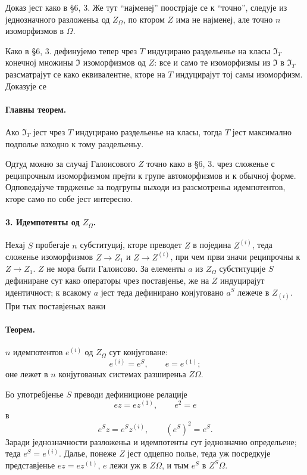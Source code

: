 ﻿\documentclass[11pt]{article}
\providecommand{\glqq}{``}
\providecommand{\grqq}{''}
\begin{document}
Доказ јест како в §6, 3. Же тут \glqq{}најменеј\grqq{} поострјаје се к \glqq{}точно\grqq{}, следује из једнозначного разложеньа од \(Z_\Omega\), по ктором \(Z\) има не најменеј, але точно \(n\) изоморфизмов в \(\Omega\).

Како в §6, 3. дефинујемо тепер чрез \(T\) индуцирано раздельенье на класы \(\mathfrak I_T\) конечној множины \(\mathfrak I\) изоморфизмов од \(Z\): все и само те изоморфизмы из \(\mathfrak I\) в \(\mathfrak I_T\) разсматрајут се како еквивалентне, кторе на \(T\) индуцирајут тој самы изоморфизм. Доказује се

\paragraph{Главны теорем.}
Ако \(\mathfrak I_T\) јест чрез \(T\) индуцирано раздельенье на класы, тогда \(T\) јест максимално подполье взходно к тому раздельеньу.

Одтуд можно за случај Галоисового \(Z\) точно како в §6, 3. чрез сложенье с реципрочным изоморфизмом прејти к групе автоморфизмов и к обычној форме. Одповедајуче тврдженье за подгрупы выходи из разсмотреньа идемпотентов, кторе само по собе јест интересно.

\paragraph{3. Идемпотенты од \(Z_\Omega\).}
Нехај \(S\) пробегаје \(n\) субституциј, кторе преводет \(Z\) в поједина \(Z^{(i)}\), теда сложенье изоморфизмов \(Z\to Z_1\) и \(Z\to Z^{(i)}\), при чем први значи реципрочны к \(Z\to Z_1\). \(Z\) не мора быти Галоисово. За елементы \(a\) из \(Z_\Omega\) субституције \(S\) дефиниране сут како операторы чрез поставјенье, же на \(Z\) индуцирајут идентичност; к всакому \(a\) јест теда дефинирано конјуговано \(a^S\) лежече в \(Z_{(i)}\). При тых поставјеньах важи

\paragraph{Теорем.}
\(n\) идемпотентов \(e^{(i)}\) од \(Z_\Omega\) сут конјуговане:
\[
        e^{(i)}=e^S,\qquad e=e^{(1)};
\]
оне лежет в \(n\) конјугованых системах разширеньа \(Z\Omega\).

Бо употребјенье \(S\) преводи дефиниционе релације
\[
        ez=ez^{(1)},\qquad e^2=e
\]
в
\[
        e^S z=e^S z^{(i)},\qquad (e^S)^2=e^S .
\]
Заради једнозначности разложеньа и идемпотенты сут једнозначно определьене; теда \(e^S=e^{(i)}\). Далье, понеже \(Z\) јест одцепно полье, теда уж посредкује представјенье \(ez=ez^{(1)}\), \(e\) лежи уж в \(Z\Omega\), и тым \(e^S\) в \(Z^S\Omega\).
\end{document}
